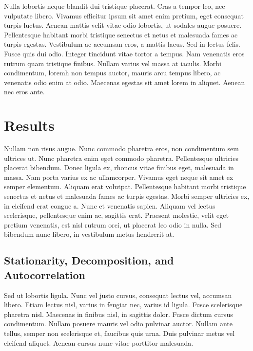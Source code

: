 \documentclass{article}
\begin{document}
Nulla lobortis neque blandit dui tristique placerat. Cras a tempor leo,
nec vulputate libero. Vivamus efficitur ipsum sit amet enim pretium,
eget consequat turpis luctus. Aenean mattis velit vitae odio lobortis,
ut sodales augue posuere. Pellentesque habitant morbi tristique senectus
et netus et malesuada fames ac turpis egestas. Vestibulum ac accumsan
eros, a mattis lacus. Sed in lectus felis. Fusce quis dui odio. Integer
tincidunt vitae tortor a tempus. Nam venenatis eros rutrum quam
tristique finibus. Nullam varius vel massa at iaculis. Morbi
condimentum, loremh non tempus auctor, mauris arcu tempus libero, ac
venenatis odio enim at odio. Maecenas egestas sit amet lorem in aliquet.
Aenean nec eros ante.

\hypertarget{results}{%
\section{Results}\label{results}}

Nullam non risus augue. Nunc commodo pharetra eros, non condimentum sem
ultrices ut. Nunc pharetra enim eget commodo pharetra. Pellentesque
ultricies placerat bibendum. Donec ligula ex, rhoncus vitae finibus
eget, malesuada in massa. Nam porta varius ex ac ullamcorper. Vivamus
eget neque sit amet ex semper elementum. Aliquam erat volutpat.
Pellentesque habitant morbi tristique senectus et netus et malesuada
fames ac turpis egestas. Morbi semper ultricies ex, in eleifend erat
congue a. Nunc et venenatis sapien. Aliquam vel lectus scelerisque,
pellentesque enim ac, sagittis erat. Praesent molestie, velit eget
pretium venenatis, est nisl rutrum orci, ut placerat leo odio in nulla.
Sed bibendum nunc libero, in vestibulum metus hendrerit at.

\hypertarget{stationarity-decomposition-and-autocorrelation}{%
\subsection{Stationarity, Decomposition, and
Autocorrelation}\label{stationarity-decomposition-and-autocorrelation}}

Sed ut lobortis ligula. Nunc vel justo cursus, consequat lectus vel,
accumsan libero. Etiam lectus nisl, varius in feugiat nec, varius id
ligula. Fusce scelerisque pharetra nisl. Maecenas in finibus nisl, in
sagittis dolor. Fusce dictum cursus condimentum. Nullam posuere mauris
vel odio pulvinar auctor. Nullam ante tellus, semper non scelerisque et,
faucibus quis urna. Duis pulvinar metus vel eleifend aliquet. Aenean
cursus nunc vitae porttitor malesuada.
\end{document}

